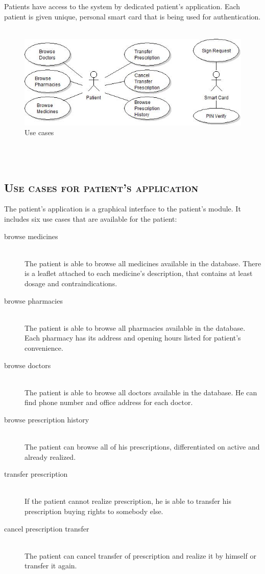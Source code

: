 \newpage
\chapter {}

Patients have access to the system by dedicated patient's application. 
Each patient is given unique, personal smart card that is being used for authentication.
\\
\\
\begin{figure}
\includegraphics[width=\linewidth]{patient/useCaseDiagram.jpg}
\caption{Use cases}
\end{figure}
\\
\\
\section{\textsc{Use cases for patient's application}}
The patient's application is a graphical interface to the patient's module. 
It includes six use cases that are available for the patient:
\begin{description}
\item[browse medicines] \hfill \\
The patient is able to browse all medicines available in the database. 
There is a leaflet attached to each medicine's description, that contains at least dosage and contraindications.
\item[browse pharmacies] \hfill \\
The patient is able to browse all pharmacies available in the database. 
Each pharmacy has its address and opening hours listed for patient's convenience.
\item[browse doctors] \hfill \\
The patient is able to browse all doctors available in the database. 
He can find phone number and office address for each doctor.
\item[browse prescription history] \hfill \\
The patient can browse all of his prescriptions, differentiated on active and already realized.
\item[transfer prescription] \hfill \\
If the patient cannot realize prescription, he is able to transfer his prescription buying rights to somebody else.
\item[cancel prescription transfer] \hfill \\
The patient can cancel transfer of prescription and realize it by himself or transfer it again.
\end{description}
